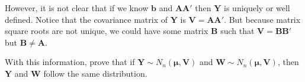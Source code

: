 \documentclass[12pt]{article}
\begin{document}
\begin{enumerate}
However, it is not clear that if we know $\bm{b}$ and $\bm{AA'}$ then $\bm{Y}$ is uniquely or well defined. Notice that the covariance matrix of $\bm{Y}$ is $\bm{V} = \bm{AA'}$. But because matrix square roots are not unique, we could have some matrix $\bm{B}$ such that $\bm{V} = \bm{BB'}$ but $\bm{B} \neq \bm{A}$.

With this information, prove that if $\bm{Y} \sim N_n(\bm{\mu}, \bm{V})$ and $\bm{W} \sim N_n (\bm{\mu},\bm{V})$, then $\bm{Y}$ and $\bm{W}$ follow the same distribution.
\end{enumerate}
\end{document}
